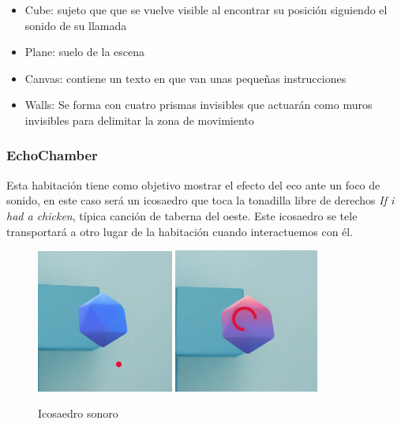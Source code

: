 \begin{itemize}
	\item Cube: sujeto que que se vuelve visible al encontrar su posición siguiendo el sonido de su llamada
	\item Plane: suelo de la escena
	\item Canvas: contiene un texto en que van unas pequeñas instrucciones
	\item Walls: Se forma con cuatro prismas invisibles que actuarán como muros invisibles para delimitar la zona de movimiento
\end{itemize}

	\subsubsection{EchoChamber}
\quad Esta habitación tiene como objetivo mostrar el efecto del eco ante un foco de sonido, en este caso será un icosaedro que toca la tonadilla libre de derechos \textit{If i had a chicken}, típica canción de taberna del oeste. Este icosaedro se tele transportará a otro lugar de la habitación cuando interactuemos con él.\\

\begin{figure}[htb]
	\centering
	\includegraphics[width=0.4\textwidth]{./imagenes/icosaedroInactivo}
	\includegraphics[width=0.4229\textwidth]{./imagenes/icosaedroActivo}
	\caption{Icosaedro sonoro}
\end{figure}


